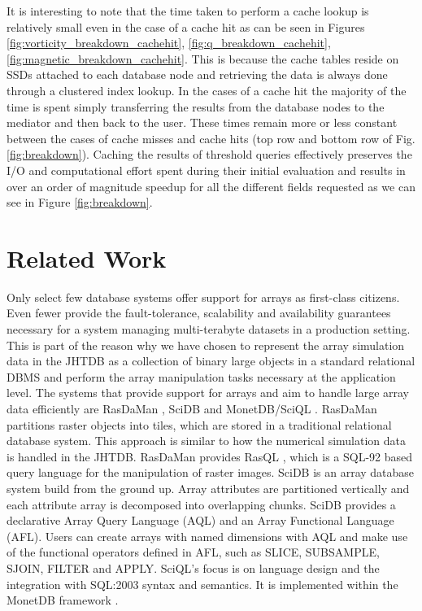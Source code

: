 \documentclass{sig-alternate}
\begin{document}
It is interesting to note that the time taken to perform a cache lookup is relatively small even in the case of a cache hit as can be seen in Figures 
\ref{fig:vorticity_breakdown_cachehit}, \ref{fig:q_breakdown_cachehit}, \ref{fig:magnetic_breakdown_cachehit}. This is because the cache tables reside on
SSDs attached to each database node and retrieving the data is always done through a clustered index lookup. In the cases of a cache hit the majority of
the time is spent simply transferring the results from the database nodes to the mediator and then back to the user. These times remain more or less
constant between the cases of cache misses and cache hits (top row and bottom row of Fig. \ref{fig:breakdown}).
Caching the results of threshold queries
effectively preserves the I/O and computational effort spent during their initial evaluation and results in over an order of magnitude speedup for all the
different fields requested as we can see in Figure \ref{fig:breakdown}.

\section{Related Work}
Only select few database systems offer support for arrays as first-class citizens. Even fewer provide the fault-tolerance, scalability and availability guarantees 
necessary for a system managing multi-terabyte datasets in a production setting. This is part of the reason why we have chosen to represent the array simulation
data in the JHTDB as a collection of binary large objects in a standard relational DBMS and perform the array manipulation tasks necessary at the application level.
The systems that provide
support for arrays and aim to handle large array data efficiently are RasDaMan \cite{Rasdaman}, SciDB \cite{Scidb} and MonetDB/SciQL \cite{Sciql}. RasDaMan
partitions raster objects into tiles, which are stored in a traditional relational database system. This approach is similar to how the numerical simulation data is 
handled in the JHTDB. RasDaMan provides RasQL \cite{Rasql}, which is a SQL-92 based query language for the manipulation of raster images. SciDB is 
an array database system build from the ground up. Array attributes are partitioned vertically and each attribute array is decomposed into overlapping chunks.
SciDB provides a declarative Array Query Language (AQL) and an Array Functional Language (AFL). Users can create arrays with named dimensions with
AQL and make use of the functional operators defined in AFL, such
as SLICE, SUBSAMPLE, SJOIN, FILTER and APPLY. SciQL's focus is on language design and the integration with SQL:2003 syntax and semantics. It is implemented
within the MonetDB framework \cite{MonetDB}.
\end{document}
